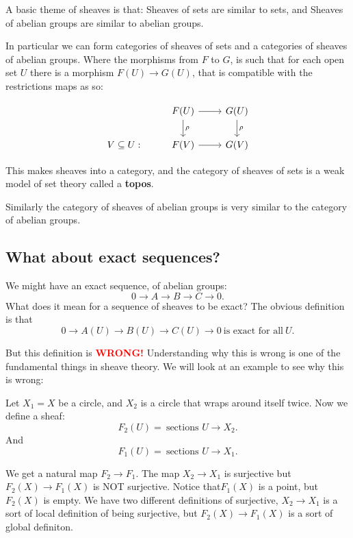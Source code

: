 \begin{remark}
 A basic theme of sheaves is that: Sheaves of sets are similar to sets, and Sheaves of abelian groups are similar to abelian groups.


 In particular we can form categories of sheaves of sets and a categories of sheaves of abelian groups. Where the morphisms from $F$ to $G$, is such that for each open set  $U$ there is a morphism $F(U)\rightarrow G(U)$, that is compatible with the restrictions maps as so:

  \begin{equation}
 \begin{tikzcd}
   &  F(U) \ar[r] \ar[d,"\rho"] & G(U) \ar[d, 
    "\rho"] \\
   V\subseteq U: & F(V) \ar[r] & G(V)
 \end{tikzcd}
 \end{equation}


 This makes sheaves into a category, and the category of sheaves of sets is a weak model of set theory called a \textbf{topos}.

 Similarly the category of sheaves of abelian groups is very similar to the category of abelian groups.
\end{remark}


\subsection{What about exact sequences?}
 We might have an exact sequence, of abelian groups: \[
    0 \rightarrow A \rightarrow B\rightarrow C \rightarrow 0
.\]
What does it mean for a sequence of sheaves to be exact? The obvious definition is that \[
    0 \rightarrow A(U) \rightarrow B(U)\rightarrow C(U) \rightarrow 0 \ \text{is exact for all} \ U
.\]

But this definition is \textcolor{red}{\textbf{WRONG!}} Understanding why this is wrong is one of the fundamental things in sheave theory. We will look at an example to see why this is wrong:

\begin{example}[]
    Let $X_1 = X$ be a circle, and $X_2$ is a circle that wraps around itself twice. Now we define a sheaf:  \[
    F_2(U) = \ \text{sections }U\rightarrow X_2
 .\]
And \[
 F_1(U) = \ \text{sections }U\rightarrow X_1    
.\]
 
We get a natural map $F_2\rightarrow F_1$. The map $X_2\rightarrow X_1$ is surjective but  $F_2(X)\rightarrow F_1(X)$ is NOT surjective. Notice that$F_1(X)$ is a point, but $F_2(X)$ is empty. We have two different definitions of surjective, $X_2\rightarrow X_1$ is a sort of local definition of being surjective, but $F_2(X)\rightarrow F_1(X)$ is a sort of global definiton.
\end{example}



